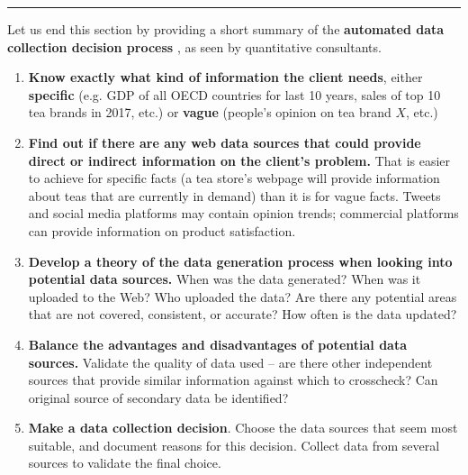 \begin{center}
    \rule{0.5\textwidth}{.4pt}
\end{center}
Let us end this section by providing a short summary of the \textbf{automated data collection decision process} \cite{DC_MRMN,DC_M}, as seen by  quantitative consultants. 
\begin{enumerate}
    \item \textbf{Know exactly what kind of information the client needs}, either \textbf{specific} (e.g. GDP of all OECD countries for last 10 years, sales of top 10 tea brands in 2017, etc.) or \textbf{vague} (people's opinion on tea brand $X$, etc.)
\item \textbf{Find out if there are any web data sources that could provide direct or indirect information on the client's problem.} That is easier to achieve for specific facts (a tea store's webpage will provide information about teas that are currently in demand) than it is for vague facts. Tweets and social media platforms may contain opinion trends; commercial platforms can provide information on product satisfaction.
\item \textbf{Develop a theory of the data generation process when looking into potential data sources.} When was the data generated? When was it uploaded to the Web? Who uploaded the data? Are there any potential areas that are not covered, consistent, or accurate? How often is the data updated?
\item \textbf{Balance the advantages and disadvantages of potential data sources.} Validate the quality of data used -- are there other independent sources that provide similar information against which to crosscheck? Can original source of secondary data be identified?
\item \textbf{Make a data collection decision}. Choose the data sources that seem most suitable, and document reasons for this decision. Collect data from several sources to validate the final choice. 
\end{enumerate}
